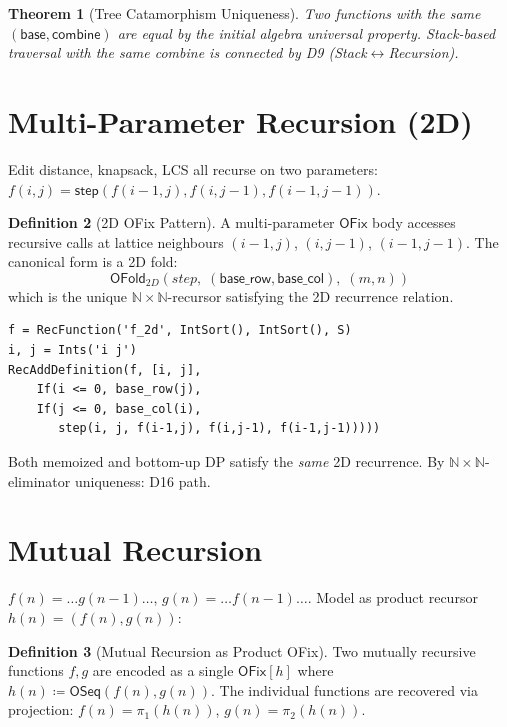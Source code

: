 \documentclass[11pt,a4paper]{report}
\theoremstyle{definition}
\newtheorem{definition}{Definition}[chapter]
\theoremstyle{plain}
\newtheorem{theorem}[definition]{Theorem}
\newcommand{\Nat}{\mathbb{N}}
\begin{document}
\begin{theorem}[Tree Catamorphism Uniqueness]
Two functions with the same $(\mathsf{base}, \mathsf{combine})$ are
equal by the initial algebra universal property.  Stack-based traversal
with the same combine is connected by D9 (Stack$\leftrightarrow$Recursion).
\end{theorem}

\section{Multi-Parameter Recursion (2D)}

Edit distance, knapsack, LCS all recurse on two parameters:
$f(i,j) = \mathsf{step}(f(i{-}1,j), f(i,j{-}1), f(i{-}1,j{-}1))$.

\begin{definition}[2D OFix Pattern]
A multi-parameter $\mathsf{OFix}$ body accesses recursive calls at
lattice neighbours $(i{-}1,j)$, $(i,j{-}1)$, $(i{-}1,j{-}1)$.  The
canonical form is a 2D fold:
\[
  \mathsf{OFold}_{2D}(\mathit{step},\;
  (\mathsf{base\_row}, \mathsf{base\_col}),\;
  (m, n))
\]
which is the unique $\Nat \times \Nat$-recursor satisfying the 2D
recurrence relation.
\end{definition}

\begin{lstlisting}[caption={2D RecFunction}]
f = RecFunction('f_2d', IntSort(), IntSort(), S)
i, j = Ints('i j')
RecAddDefinition(f, [i, j],
    If(i <= 0, base_row(j),
    If(j <= 0, base_col(i),
       step(i, j, f(i-1,j), f(i,j-1), f(i-1,j-1)))))
\end{lstlisting}

Both memoized and bottom-up DP satisfy the \emph{same} 2D recurrence.
By $\Nat \times \Nat$-eliminator uniqueness: D16 path.

\section{Mutual Recursion}

$f(n) = \ldots g(n{-}1)\ldots$, $g(n) = \ldots f(n{-}1)\ldots$.
Model as product recursor $h(n) = (f(n), g(n))$:

\begin{definition}[Mutual Recursion as Product OFix]
Two mutually recursive functions $f, g$ are encoded as a single
$\mathsf{OFix}[h]$ where $h(n) \coloneqq \mathsf{OSeq}(f(n), g(n))$.
The individual functions are recovered via projection:
$f(n) = \pi_1(h(n))$, $g(n) = \pi_2(h(n))$.
\end{definition}
\end{document}
